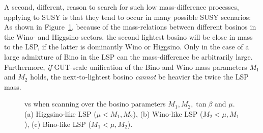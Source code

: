 A second, different, reason to search for such low mass-difference
processes, applying to SUSY
is that they tend to occur in many possible SUSY scenarios:
As shown in Figure~\ref{fig:searches_tomohikoscan},
because of the mass-relations between different bosinos in the Wino- and
Higgsino-sectors,
the second lightest bosino will be close in mass to the LSP,
if the latter is dominantly Wino or Higgsino.
Only in the case of a large admixture of Bino in the LSP
can the mass-difference be arbitrarily large.
Furthermore, 
{\it if} GUT-scale unification of  the Bino and Wino mass 
parameters $M_1$ and $M_2$ holds,
the next-to-lightest bosino {\it cannot} be heavier the twice the LSP mass.
\begin{figure}[]
  \begin{center}
  \end{center}
  \caption{\label{fig:searches_tomohikoscan}  vs  when scanning over the bosino parameters
$M_1 , M_2, \tan{\beta}$ and $\mu$. (a) Higgsino-like LSP ($\mu < M_1 , M_2$), 
(b)  Wino-like LSP ($M_2 < \mu , M_1$), (c) Bino-like LSP ($M_1 < \mu , M_2$). }
\end{figure}

